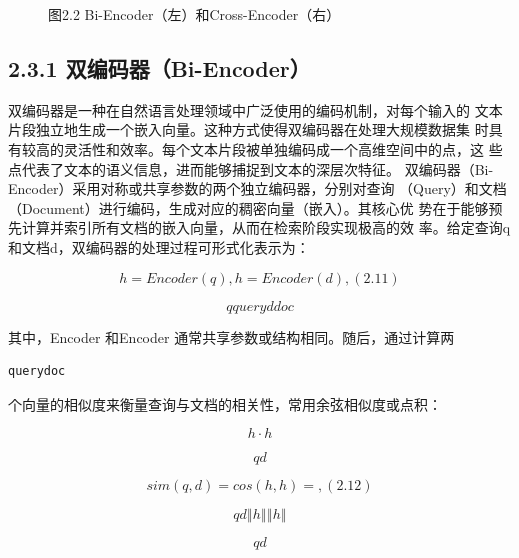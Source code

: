 \documentclass[12pt,a4paper,openright,UTF8]{ctexbook}
\begin{document}
\begin{figure}[htbp]
\centering
{}
\caption{图2.2 Bi-Encoder（左）和Cross-Encoder（右）}
\end{figure}

\subsection{2.3.1 双编码器（Bi-Encoder）}

双编码器是一种在自然语言处理领域中广泛使用的编码机制，对每个输入的 文本片段独立地生成一个嵌入向量。这种方式使得双编码器在处理大规模数据集 时具有较高的灵活性和效率。每个文本片段被单独编码成一个高维空间中的点，这 些点代表了文本的语义信息，进而能够捕捉到文本的深层次特征。 双编码器（Bi-Encoder）采用对称或共享参数的两个独立编码器，分别对查询 （Query）和文档（Document）进行编码，生成对应的稠密向量（嵌入）。其核心优 势在于能够预先计算并索引所有文档的嵌入向量，从而在检索阶段实现极高的效 率。给定查询q和文档d，双编码器的处理过程可形式化表示为：

\begin{equation*}
h= Encoder(q),h= Encoder(d),(2.11)
\end{equation*}

\begin{equation*}
qqueryddoc
\end{equation*}

其中，Encoder 和Encoder 通常共享参数或结构相同。随后，通过计算两

\begin{lstlisting}
querydoc
\end{lstlisting}
个向量的相似度来衡量查询与文档的相关性，常用余弦相似度或点积：

\begin{equation*}
h\cdot h
\end{equation*}

\begin{equation*}
qd
\end{equation*}

\begin{equation*}
sim(q, d) = cos(h, h) =,(2.12)
\end{equation*}

\begin{equation*}
qd‖h‖‖h‖
\end{equation*}

\begin{equation*}
qd
\end{equation*}
\end{document}
